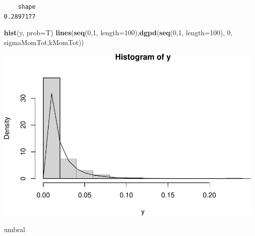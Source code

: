\documentclass[
  12pt]{article}
\newenvironment{Shaded}{\begin{snugshade}}{\end{snugshade}}
\newcommand{\AttributeTok}[1]{\textcolor[rgb]{0.13,0.29,0.53}{#1}}
\newcommand{\CommentTok}[1]{\textcolor[rgb]{0.56,0.35,0.01}{\textit{#1}}}
\newcommand{\DecValTok}[1]{\textcolor[rgb]{0.00,0.00,0.81}{#1}}
\newcommand{\FunctionTok}[1]{\textcolor[rgb]{0.13,0.29,0.53}{\textbf{#1}}}
\newcommand{\NormalTok}[1]{#1}
\newcommand{\OtherTok}[1]{\textcolor[rgb]{0.56,0.35,0.01}{#1}}
\newcommand{\SpecialCharTok}[1]{\textcolor[rgb]{0.81,0.36,0.00}{\textbf{#1}}}
\newcommand{\StringTok}[1]{\textcolor[rgb]{0.31,0.60,0.02}{#1}}
\begin{document}
\begin{verbatim}
    shape 
0.2897177 
\end{verbatim}

\begin{Shaded}
\begin{Highlighting}[]
\FunctionTok{hist}\NormalTok{(y, }\AttributeTok{prob=}\NormalTok{T)}
\FunctionTok{lines}\NormalTok{(}\FunctionTok{seq}\NormalTok{(}\DecValTok{0}\NormalTok{,}\DecValTok{1}\NormalTok{, }\AttributeTok{length=}\DecValTok{100}\NormalTok{),}\FunctionTok{dgpd}\NormalTok{(}\FunctionTok{seq}\NormalTok{(}\DecValTok{0}\NormalTok{,}\DecValTok{1}\NormalTok{, }\AttributeTok{length=}\DecValTok{100}\NormalTok{), }\DecValTok{0}\NormalTok{, sigmaMomTot,kMomTot))}
\end{Highlighting}
\end{Shaded}

\includegraphics{Entrega_files/figure-latex/unnamed-chunk-48-1.pdf}

\begin{Shaded}
\end{Shaded}

\begin{Shaded}
\begin{Highlighting}[]
\NormalTok{umbral}
\end{Highlighting}
\end{Shaded}
\end{document}
